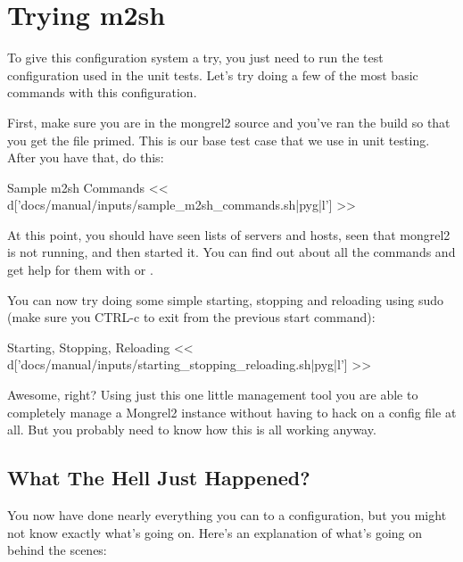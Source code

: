 \section{Trying m2sh}

To give this configuration system a try, you just need to run the test configuration used
in the unit tests.  Let's try doing a few of the most basic commands with this configuration.

First, make sure you are in the mongrel2 source and you've ran the build so that you get the
 file primed.  This is our base test case that we use in unit testing.
After you have that, do this:

\begin{code}{Sample m2sh Commands}
<< d['docs/manual/inputs/sample_m2sh_commands.sh|pyg|l'] >>
\end{code}

At this point, you should have seen lists of servers and hosts, seen that mongrel2 is
not running, and then started it.  You can find out about all the commands and
get help for them with  or .

You can now try doing some simple starting, stopping and reloading using sudo (make sure you CTRL-c
to exit from the previous start command):

\begin{code}{Starting, Stopping, Reloading}
<< d['docs/manual/inputs/starting_stopping_reloading.sh|pyg|l'] >>
\end{code}

Awesome, right?  Using just this one little management tool you
are able to completely manage a Mongrel2 instance without having to hack
on a config file at all.  But you probably need to know how this is all
working anyway.


\subsection{What The Hell Just Happened?}

You now have done nearly everything you can to a configuration, but you might not know exactly
what's going on.  Here's an explanation of what's going on behind the scenes:

